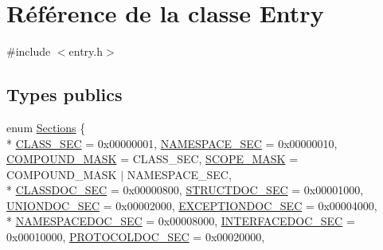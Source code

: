 \hypertarget{class_entry}{}\section{Référence de la classe Entry}
\label{class_entry}


{\ttfamily \#include $<$entry.\+h$>$}

\subsection*{Types publics}
\begin{DoxyCompactItemize}
\item 
enum \hyperlink{class_entry_a1e615d53eb7db6d16c19fcb5788fbd9e}{Sections} \{ \\*
\hyperlink{class_entry_a1e615d53eb7db6d16c19fcb5788fbd9eafe3e2fbfb346a3d291cea00bdae441fb}{C\+L\+A\+S\+S\+\_\+\+S\+E\+C} = 0x00000001, 
\hyperlink{class_entry_a1e615d53eb7db6d16c19fcb5788fbd9ea86229a756764e3d5f94ad24c19cd2ce1}{N\+A\+M\+E\+S\+P\+A\+C\+E\+\_\+\+S\+E\+C} = 0x00000010, 
\hyperlink{class_entry_a1e615d53eb7db6d16c19fcb5788fbd9ea0fbc29ab81cad1713e5b59f04a6866fb}{C\+O\+M\+P\+O\+U\+N\+D\+\_\+\+M\+A\+S\+K} = C\+L\+A\+S\+S\+\_\+\+S\+E\+C, 
\hyperlink{class_entry_a1e615d53eb7db6d16c19fcb5788fbd9ea07caefb6556cecb7ebaf6eb730fdd871}{S\+C\+O\+P\+E\+\_\+\+M\+A\+S\+K} = C\+O\+M\+P\+O\+U\+N\+D\+\_\+\+M\+A\+S\+K $\vert$ N\+A\+M\+E\+S\+P\+A\+C\+E\+\_\+\+S\+E\+C, 
\\*
\hyperlink{class_entry_a1e615d53eb7db6d16c19fcb5788fbd9eac0433f4df4711b49a0e7dfa5565764e4}{C\+L\+A\+S\+S\+D\+O\+C\+\_\+\+S\+E\+C} = 0x00000800, 
\hyperlink{class_entry_a1e615d53eb7db6d16c19fcb5788fbd9ea5067509972e2fbb0b77112960f72e0ec}{S\+T\+R\+U\+C\+T\+D\+O\+C\+\_\+\+S\+E\+C} = 0x00001000, 
\hyperlink{class_entry_a1e615d53eb7db6d16c19fcb5788fbd9ea9204315b71c1ecf6824c749a958f61b5}{U\+N\+I\+O\+N\+D\+O\+C\+\_\+\+S\+E\+C} = 0x00002000, 
\hyperlink{class_entry_a1e615d53eb7db6d16c19fcb5788fbd9eabf09227a400f2348ecff8291632c45b0}{E\+X\+C\+E\+P\+T\+I\+O\+N\+D\+O\+C\+\_\+\+S\+E\+C} = 0x00004000, 
\\*
\hyperlink{class_entry_a1e615d53eb7db6d16c19fcb5788fbd9ea84f12bd39a098e35429a33c7b2f2e91f}{N\+A\+M\+E\+S\+P\+A\+C\+E\+D\+O\+C\+\_\+\+S\+E\+C} = 0x00008000, 
\hyperlink{class_entry_a1e615d53eb7db6d16c19fcb5788fbd9ea1d38478f61ce5d9d8f1de84d6fb9a1c7}{I\+N\+T\+E\+R\+F\+A\+C\+E\+D\+O\+C\+\_\+\+S\+E\+C} = 0x00010000, 
\hyperlink{class_entry_a1e615d53eb7db6d16c19fcb5788fbd9ead9fa44283a6ddc98f642c7a478e8809c}{P\+R\+O\+T\+O\+C\+O\+L\+D\+O\+C\+\_\+\+S\+E\+C} = 0x00020000, 

\end{DoxyCompactItemize}
